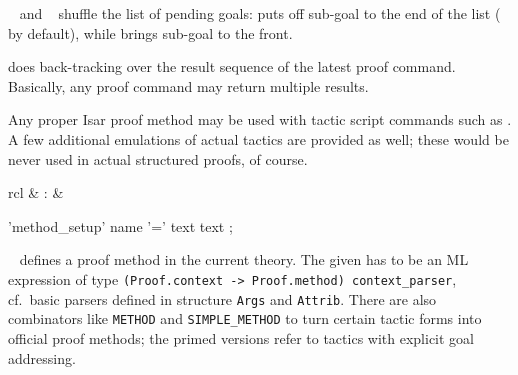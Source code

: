 \begin{isabellebody}
\begin{isamarkuptext}
\begin{description}
  \item \hyperlink{command.defer}{\mbox{}}~ and \hyperlink{command.prefer}{\mbox{}}~
  shuffle the list of pending goals: \hyperlink{command.defer}{\mbox{}} puts off
  sub-goal  to the end of the list ( by
  default), while \hyperlink{command.prefer}{\mbox{}} brings sub-goal  to the
  front.
  
  \item \hyperlink{command.back}{\mbox{}} does back-tracking over the result sequence
  of the latest proof command.  Basically, any proof command may
  return multiple results.
  
  \end{description}

  Any proper Isar proof method may be used with tactic script commands
  such as \hyperlink{command.apply}{\mbox{}}.  A few additional emulations of actual
  tactics are provided as well; these would be never used in actual
  structured proofs, of course.%
\end{isamarkuptext}%
\isamarkuptrue%
%
\isamarkuptrue%
%
\begin{isamarkuptext}%
\begin{matharray}{rcl}
    \hypertarget{command.method-setup}{\hyperlink{command.method-setup}{\mbox{}}} & : &  \\
  \end{matharray}

  \begin{rail}
    'method_setup' name '=' text text
    ;
  \end{rail}

  \begin{description}

  \item \hyperlink{command.method-setup}{\mbox{}}~
  defines a proof method in the current theory.  The given  has to be an ML expression of type
  \verb|(Proof.context -> Proof.method) context_parser|, cf.\
  basic parsers defined in structure \verb|Args| and \verb|Attrib|.  There are also combinators like \verb|METHOD| and \verb|SIMPLE_METHOD| to turn certain tactic forms into official proof
  methods; the primed versions refer to tactics with explicit goal
  addressing.


\end{description}
\end{isamarkuptext}
\end{isabellebody}
